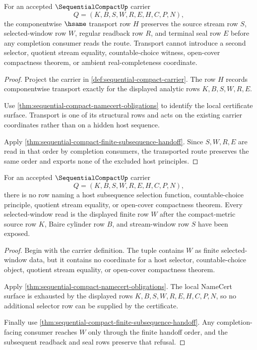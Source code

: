 \begin{theorem}
\label{thm:sequential-compact-window-transport}
For an accepted $\SequentialCompactUp$ carrier
$$
Q=(K,B,S,W,R,E,H,C,P,N),
$$
the componentwise $\hsame$ transport row $H$ preserves the source stream row $S$, selected-window row $W$, regular readback row $R$, and terminal seal row $E$ before any completion consumer reads the route. Transport cannot introduce a second selector, quotient stream equality, countable-choice witness, open-cover compactness theorem, or ambient real-completeness coordinate.
\end{theorem}
\begin{proof}
Project the carrier in \autoref{def:sequential-compact-carrier}. The row $H$ records componentwise transport exactly for the displayed analytic rows $K,B,S,W,R,E$.

Use \autoref{thm:sequential-compact-namecert-obligations} to identify the local certificate surface. Transport is one of its structural rows and acts on the existing carrier coordinates rather than on a hidden host sequence.

Apply \autoref{thm:sequential-compact-finite-subsequence-handoff}. Since $S,W,R,E$ are read in that order by completion consumers, the transported route preserves the same order and exports none of the excluded host principles.
\end{proof}

\begin{theorem}
\label{thm:sequential-compact-selector-refusal}
For an accepted $\SequentialCompactUp$ carrier
$$
Q=(K,B,S,W,R,E,H,C,P,N),
$$
there is no row naming a host subsequence selection function, countable-choice principle, quotient stream equality, or open-cover compactness theorem. Every selected-window read is the displayed finite row $W$ after the compact-metric source row $K$, Baire cylinder row $B$, and stream-window row $S$ have been exposed.
\end{theorem}
\begin{proof}
Begin with the carrier definition. The tuple contains $W$ as finite selected-window data, but it contains no coordinate for a host selector, countable-choice object, quotient stream equality, or open-cover compactness theorem.

Apply \autoref{thm:sequential-compact-namecert-obligations}. The local NameCert surface is exhausted by the displayed rows $K,B,S,W,R,E,H,C,P,N$, so no additional selector row can be supplied by the certificate.

Finally use \autoref{thm:sequential-compact-finite-subsequence-handoff}. Any completion-facing consumer reaches $W$ only through the finite handoff order, and the subsequent readback and seal rows preserve that refusal.
\end{proof}

